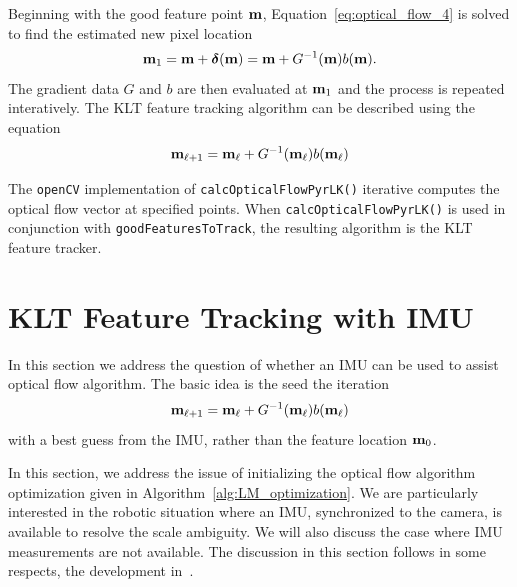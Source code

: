 Beginning with the good feature point $\mathbf{m}$, Equation~\eqref{eq:optical_flow_4} is solved to find the estimated new pixel location 
\[
\mathbf{m}_1 = \mathbf{m} + \boldsymbol{\delta}(\mathbf{m}) = \mathbf{m} + G^{-1}(\mathbf{m})b(\mathbf{m}).  
\]
The gradient data $G$ and $b$ are then evaluated at $\mathbf{m}_1$ and the process is repeated interatively.  The KLT feature tracking algorithm can be described using the equation
\[
\mathbf{m}_{\ell+1} = \mathbf{m}_\ell + G^{-1}(\mathbf{m}_\ell)b(\mathbf{m}_\ell)  
\]

The \texttt{openCV} implementation of \texttt{calcOpticalFlowPyrLK()} iterative computes the optical flow vector at specified points.  When \texttt{calcOpticalFlowPyrLK()} is used in conjunction with \texttt{goodFeaturesToTrack}, the resulting algorithm is the KLT feature tracker.


\section{KLT Feature Tracking with IMU}
\label{sec:klt_feature_tracking_with_imu}

In this section we address the question of whether an IMU can be used to assist optical flow algorithm.  The basic idea is the seed the iteration
\[
\mathbf{m}_{\ell+1} = \mathbf{m}_\ell + G^{-1}(\mathbf{m}_\ell)b(\mathbf{m}_\ell)
\]
with a best guess from the IMU, rather than the feature location $\mathbf{m}_0$.  



In this section, we address the issue of initializing the optical flow algorithm  optimization given in Algorithm~\ref{alg:LM_optimization}.  We are particularly interested in the robotic situation where an IMU, synchronized to the camera, is available to resolve the scale ambiguity.  We will also discuss the case where IMU measurements are not available.  The discussion in this section follows in some respects, the development in~\cite{ForsterCarloneDellaert17}.  

